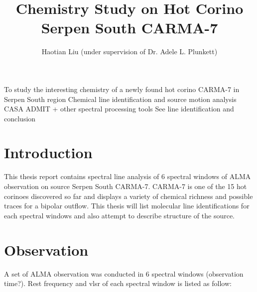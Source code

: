 \documentclass{aa}
\begin{document}
 


   \title{Chemistry Study on Hot Corino Serpen South CARMA-7}



   \author{Haotian Liu (under supervision of Dr. Adele L. Plunkett)}





 
  \abstract
   {To study the interesting chemistry of a newly found hot corino CARMA-7 in Serpen South region}
   {Chemical line identification and source motion analysis}
   {CASA ADMIT + other spectral processing tools}
   {See line identification and conclusion}
   {}


   \maketitle
%

\section{Introduction}

    This thesis report contains spectral line analysis of 6 spectral windows of ALMA observation on source Serpen South CARMA-7. CARMA-7 is one of the 15 hot corinoes discovered so far and displays a variety of chemical richness and possible traces for a bipolar outflow. This thesis will list molecular line identifications for each spectral windows and also attempt to describe structure of the source.

\section{Observation}
   A set of ALMA observation was conducted in 6 spectral windows (observation time?). Rest frequency and vlsr of each spectral window is listed as follow:
   
\end{document}

